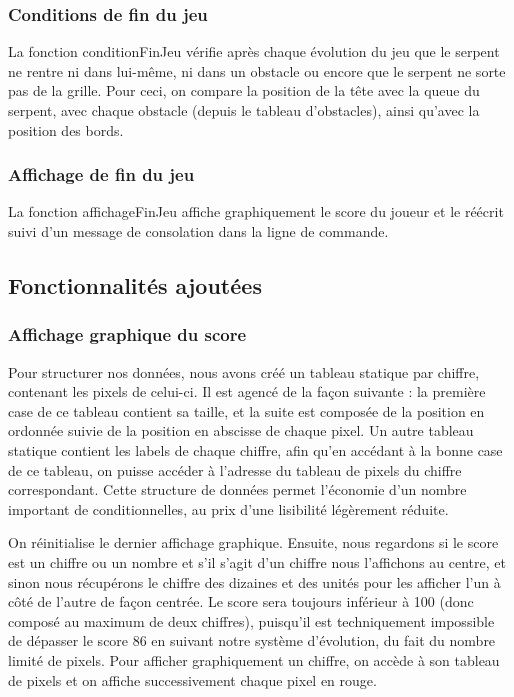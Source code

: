 \documentclass[a4paper]{article}
\begin{document}
\subsubsection*{Conditions de fin du jeu}
La fonction conditionFinJeu vérifie après chaque évolution du jeu que le serpent ne rentre ni dans lui-même, ni dans un obstacle ou encore que le serpent ne sorte pas de 
la grille. Pour ceci, on compare la position de la tête avec la queue du serpent, avec chaque obstacle (depuis le tableau d'obstacles), ainsi qu'avec la position des bords.

\subsubsection*{Affichage de fin du jeu}
La fonction affichageFinJeu affiche graphiquement le score du joueur et le réécrit suivi d'un message de consolation dans la ligne de commande.

\subsection{Fonctionnalités ajoutées}

\subsubsection*{Affichage graphique du score}
Pour structurer nos données, nous avons créé un tableau statique par chiffre, contenant les pixels de celui-ci. Il est agencé de la façon suivante : la première case de ce 
tableau contient sa taille, et la suite est composée de la position en ordonnée suivie de la position en abscisse de chaque pixel.
Un autre tableau statique contient les labels de chaque chiffre, afin qu'en accédant à la bonne case de ce tableau, on puisse accéder à l'adresse du tableau de pixels du 
chiffre correspondant. Cette structure de données permet l'économie d'un nombre important de conditionnelles, au prix d'une lisibilité légèrement réduite.

On réinitialise le dernier affichage graphique. Ensuite, nous regardons si le score est un chiffre ou un nombre et s'il s'agit d'un chiffre nous l'affichons au centre, 
et sinon nous récupérons le chiffre des dizaines et des unités pour les afficher l'un à côté de l'autre de façon centrée. 
Le score sera toujours inférieur à 100 (donc composé au maximum de deux chiffres), puisqu'il est techniquement impossible de dépasser le score 86 en suivant
notre système d'évolution, du fait du nombre limité de pixels.
Pour afficher graphiquement un chiffre, on accède à son tableau de pixels et on affiche successivement chaque pixel en rouge.
\end{document}
